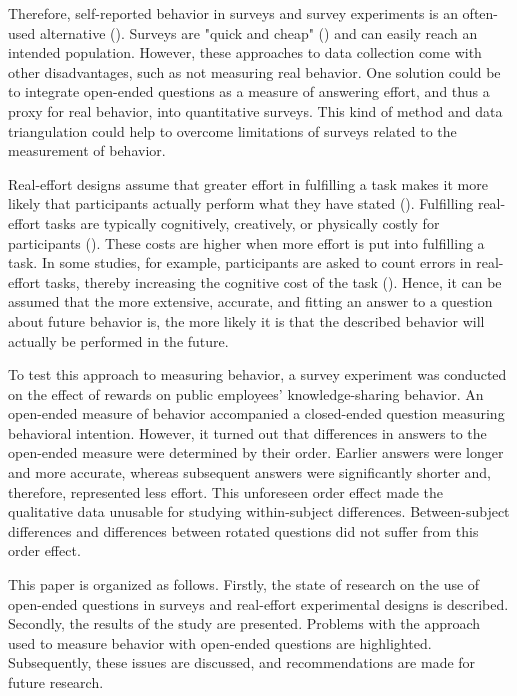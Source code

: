 \documentclass[twocolumn, issue, empirical, authordate]{jote-new-article}
\begin{document}
Therefore, self-reported behavior in surveys and survey experiments is an often-used alternative (). Surveys are "quick and cheap" () and can easily reach an intended population. However, these approaches to data collection come with other disadvantages, such as not measuring real behavior. One solution could be to integrate open-ended questions as a measure of answering effort, and thus a proxy for real behavior, into quantitative surveys. This kind of method and data triangulation could help to overcome limitations of surveys related to the measurement of behavior.

Real-effort designs assume that greater effort in fulfilling a task makes it more likely that participants actually perform what they have stated (). Fulfilling real-effort tasks are typically cognitively, creatively, or physically costly for participants (). These costs are higher when more effort is put into fulfilling a task. In some studies, for example, participants are asked to count errors in real-effort tasks, thereby increasing the cognitive cost of the task (). Hence, it can be assumed that the more extensive, accurate, and fitting an answer to a question about future behavior is, the more likely it is that the described behavior will actually be performed in the future.

To test this approach to measuring behavior, a survey experiment was conducted on the effect of rewards on public employees' knowledge-sharing behavior. An open-ended measure of behavior accompanied a closed-ended question measuring behavioral intention.
However, it turned out that differences in answers to the open-ended measure were determined by their order. Earlier answers were longer and more accurate, whereas subsequent answers were significantly shorter and, therefore, represented less effort. This unforeseen order effect made the qualitative data unusable for studying within-subject differences. Between-subject differences and differences between rotated questions did not suffer from this order effect.

This paper is organized as follows. Firstly, the state of research on the use of open-ended questions in surveys and real-effort experimental designs is described. Secondly, the results of the study are presented.
Problems with the approach used to measure behavior with open-ended questions are highlighted. Subsequently, these issues are discussed, and recommendations are made for future research.
\end{document}
